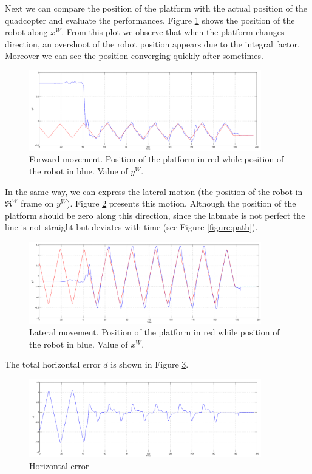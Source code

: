 Next we can compare the position of the platform with the actual position of the quadcopter and evaluate the performances. Figure \ref{figure:forward} shows the position of the robot along $x^W$. From this plot we observe that when the platform changes direction, an overshoot of the robot position appears due to the integral factor. Moreover we can see the position converging quickly after sometimes. 
 
   \begin{figure}[h]
    \centering
      \includegraphics[width = 0.9\textwidth ]{wy.png}
       \caption[Lateral movement]{Forward movement. Position of the platform in red while position of the robot in blue. Value of $y^W$.}
      \label{figure:forward}
   \end{figure}
   
\noindent
In the same way, we can express the lateral motion (the position of the robot in $\Re^W$ frame on $y^W$). Figure \ref{figure:lateral} presents this motion. Although the position of the platform should be zero along this direction, since the labmate is not perfect the line is not straight but deviates with time (see Figure \ref{figure:path}).
  \begin{figure}[H]
    \centering
      \includegraphics[width = 0.9\textwidth ]{wx.png}
       \caption[Lateral movement]{Lateral movement. Position of the platform in red while position of the robot in blue. Value of $x^W$.}
      \label{figure:lateral}
   \end{figure}
   
\noindent
The total horizontal error $d$ is shown in Figure \ref{figure:err}.
\begin{figure}[h]
    \centering
      \includegraphics[width = 0.9\textwidth]{d.png}
       \caption{Horizontal error }
      \label{figure:err}
\end{figure}

